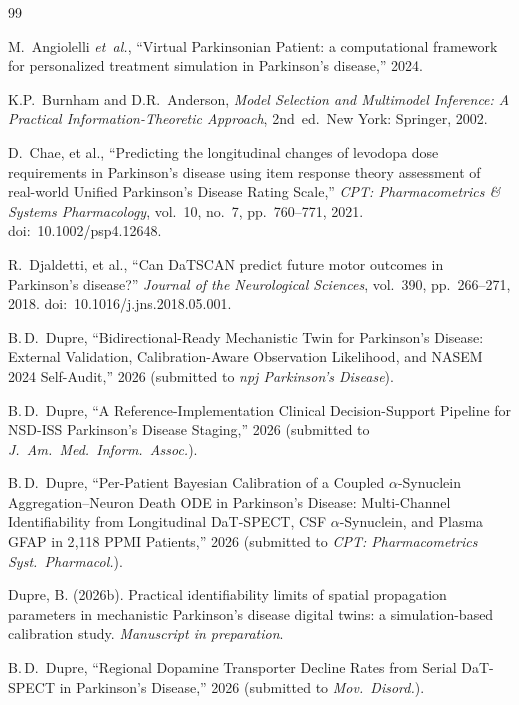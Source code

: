 \begin{thebibliography}{99}

M.~Angiolelli \textit{et~al.}, ``Virtual Parkinsonian Patient: a
computational framework for personalized treatment simulation in
Parkinson's disease,'' 2024.

K.P.~Burnham and D.R.~Anderson, \textit{Model Selection and Multimodel
Inference: A Practical Information-Theoretic Approach}, 2nd~ed.\
New York: Springer, 2002.

D.~Chae, et al., ``Predicting the longitudinal changes of levodopa dose requirements in Parkinson's disease using item response theory assessment of real-world Unified Parkinson's Disease Rating Scale,'' \textit{CPT: Pharmacometrics \& Systems Pharmacology}, vol.~10, no.~7, pp.~760--771, 2021. doi:~10.1002/psp4.12648.

R.~Djaldetti, et al., ``Can DaTSCAN predict future motor outcomes in Parkinson's disease?'' \textit{Journal of the Neurological Sciences}, vol.~390, pp.~266--271, 2018. doi:~10.1016/j.jns.2018.05.001.

 B.\,D.~Dupre, ``Bidirectional-Ready Mechanistic Twin for Parkinson's Disease: External Validation, Calibration-Aware Observation Likelihood, and NASEM 2024 Self-Audit,'' 2026 (submitted to \textit{npj Parkinson's Disease}).

 B.\,D.~Dupre, ``A Reference-Implementation Clinical Decision-Support Pipeline for NSD-ISS Parkinson's Disease Staging,'' 2026 (submitted to \textit{J.\ Am.\ Med.\ Inform.\ Assoc.}).

 B.\,D.~Dupre, ``Per-Patient Bayesian Calibration of a Coupled $\alpha$-Synuclein Aggregation--Neuron Death ODE in Parkinson's Disease: Multi-Channel Identifiability from Longitudinal DaT-SPECT, CSF $\alpha$-Synuclein, and Plasma GFAP in 2{,}118 PPMI Patients,'' 2026 (submitted to \textit{CPT: Pharmacometrics Syst.\ Pharmacol.}).

Dupre, B. (2026b).
\newblock Practical identifiability limits of spatial propagation parameters in mechanistic Parkinson's disease digital twins: a simulation-based calibration study.
\newblock \emph{Manuscript in preparation}.

 B.\,D.~Dupre, ``Regional Dopamine Transporter Decline Rates from Serial DaT-SPECT in Parkinson's Disease,'' 2026 (submitted to \textit{Mov.\ Disord.}).


\end{thebibliography}
